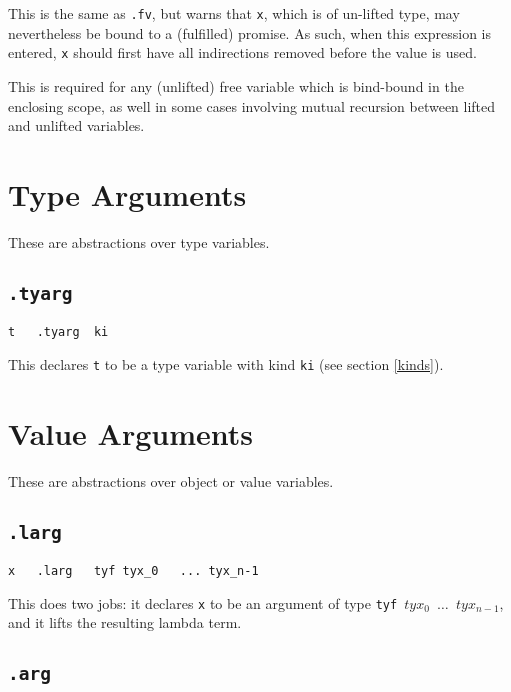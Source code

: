 \documentclass{report}
\newcommand\stringcode[1]{\texttt{#1}}
\begin{document}
This is the same as \stringcode{.fv}, but warns that \stringcode{x}, which is of un-lifted type, may nevertheless be bound to a (fulfilled) promise.
As such, when this expression is entered, \stringcode{x} should first have all indirections removed before the value is used.

This is required for any (unlifted) free variable which is bind-bound in the enclosing scope,
as well in some cases involving mutual recursion between lifted and unlifted variables.

\section{Type Arguments}
\label{code_type_arg}

These are abstractions over type variables.

\subsection{\stringcode{.tyarg}}

\begin{verbatim}
t	.tyarg	ki
\end{verbatim}

This declares \stringcode{t} to be a type variable with kind \stringcode{ki}  (see section \ref{kinds}).

\section{Value Arguments}
\label{value_arg}

These are abstractions over object or value variables.

\subsection{\stringcode{.larg}}

\begin{verbatim}
x	.larg	tyf	tyx_0	...	tyx_n-1
\end{verbatim}

This does two jobs:
it declares \stringcode{x} to be an argument of type \stringcode{tyf $tyx_0$ $\ldots$ $tyx_{n-1}$},
and it lifts the resulting lambda term.

\subsection{\stringcode{.arg}}
\end{document}
